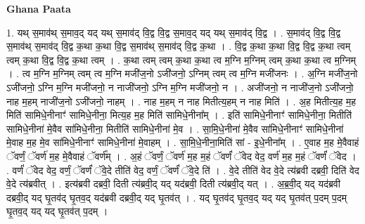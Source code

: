\documentclass[17pt]{extarticle}
\begin{document}
\textbf{Ghana Paata } \newline

1. यथ् स॒माव॑थ् स॒माव॒द् यद् यथ् स॒माव॑द् वि॒द्व वि॒द्व स॒माव॒द् यद् यथ् स॒माव॑द् वि॒द्व । . स॒माव॑द् वि॒द्व वि॒द्व स॒माव॑थ् स॒माव॑द् वि॒द्व क॒था क॒था वि॒द्व स॒माव॑थ् स॒माव॑द् वि॒द्व क॒था । . वि॒द्व क॒था क॒था वि॒द्व वि॒द्व क॒था त्वम् त्वम् क॒था वि॒द्व वि॒द्व क॒था त्वम् । . क॒था त्वम् त्वम् क॒था क॒था त्व म॒ग्नि म॒ग्निम् त्वम् क॒था क॒था त्व म॒ग्निम् । . त्व म॒ग्नि म॒ग्निम् त्वम् त्व म॒ग्नि मजी॑ज॒नो ऽजी॑जनो॒ ऽग्निम् त्वम् त्व म॒ग्नि मजी॑जनः । . अ॒ग्नि मजी॑ज॒नो ऽजी॑जनो॒ ऽग्नि म॒ग्नि मजी॑जनो॒ न नाजी॑जनो॒ ऽग्नि म॒ग्नि मजी॑जनो॒ न । . अजी॑जनो॒ न नाजी॑ज॒नो ऽजी॑जनो॒ नाह म॒हम् नाजी॑ज॒नो ऽजी॑जनो॒ नाहम् । . नाह म॒हम् न नाह मितीत्य॒हम् न नाह मिति॑ । . अ॒ह मितीत्य॒ह म॒ह मिति॑ सामिधे॒नीनाꣳ॑ सामिधे॒नीना॒ मित्य॒ह म॒ह मिति॑ सामिधे॒नीना᳚म् । . इति॑ सामिधे॒नीनाꣳ॑ सामिधे॒नीना॒ मितीति॑ सामिधे॒नीना॑ मे॒वैव सा॑मिधे॒नीना॒ मितीति॑ सामिधे॒नीना॑ मे॒व । . सा॒मि॒धे॒नीना॑ मे॒वैव सा॑मिधे॒नीनाꣳ॑ सामिधे॒नीना॑ मे॒वाह म॒ह मे॒व सा॑मिधे॒नीनाꣳ॑ सामिधे॒नीना॑ मे॒वाहम् । . सा॒मि॒धे॒नीना॒मिति॑ सां - इ॒धे॒नीना᳚म् । . ए॒वाह म॒ह मे॒वैवाहं ॅवर्णं॒ ॅवर्ण॑ म॒ह मे॒वैवाहं ॅवर्ण᳚म् । . अ॒हं ॅवर्णं॒ ॅवर्ण॑ म॒ह म॒हं ॅवर्णं॑ ॅवेद वेद॒ वर्ण॑ म॒ह म॒हं ॅवर्णं॑ ॅवेद । . वर्णं॑ ॅवेद वेद॒ वर्णं॒ ॅवर्णं॑ ॅवे॒दे तीति॑ वेद॒ वर्णं॒ ॅवर्णं॑ ॅवे॒दे ति॑ । . वे॒दे तीति॑ वेद वे॒दे त्य॑ब्रवी दब्रवी॒ दिति॑ वेद वे॒दे त्य॑ब्रवीत् । . इत्य॑ब्रवी दब्रवी॒ दिती त्य॑ब्रवी॒द् यद् यद॑ब्रवी॒ दिती त्य॑ब्रवी॒द् यत् । . अ॒ब्र॒वी॒द् यद् यद॑ब्रवी दब्रवी॒द् यद् घृ॒तव॑द् घृ॒तव॒द् यद॑ब्रवी दब्रवी॒द् यद् घृ॒तव॑त् । . यद् घृ॒तव॑द् घृ॒तव॒द् यद् यद् घृ॒तव॑त् प॒दम् प॒दम् घृ॒तव॒द् यद् यद् घृ॒तव॑त् प॒दम् । \newline
\end{document}
